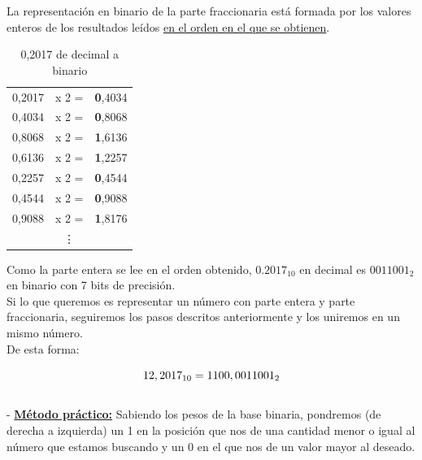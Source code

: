 \documentclass[12pt]{article}
\begin{document}
						La representación en binario de la parte fraccionaria está formada por los valores enteros de los resultados leídos \underline{en el orden en el que se obtienen}.
						
						\begin{table}[H]
							\centering
							\begin{tabular}{ccc}
								0,2017 & x 2 = & \textbf{0},4034 \\
								0,4034 & x 2 = & \textbf{0},8068 \\
								0,8068 & x 2 = & \textbf{1},6136 \\
								0,6136 & x 2 = & \textbf{1},2257 \\
								0,2257 & x 2 = & \textbf{0},4544 \\
								0,4544 & x 2 = & \textbf{0},9088 \\
								0,9088 & x 2 = & \textbf{1},8176 \\
								& \vdots & \\
							\end{tabular}
							\caption*{0,2017 de decimal a binario}						 
						\end{table}
						
						\newpage

						Como la parte entera se lee en el orden obtenido, $0.2017_{10}$ en decimal es $0011001_{2}$ en binario con 7 bits de precisión.\\
						
						Si lo que queremos es representar un número con parte entera y parte fraccionaria, seguiremos los pasos descritos anteriormente y los uniremos en un mismo número.\\
						
						De esta forma:
						
						\begin{equation}
							\notag
							12,2017_{10} = 1100,0011001_{2}
						\end{equation}\\
						
				- \underline{\textbf{Método práctico:}} Sabiendo los pesos de la base binaria, pondremos (de derecha a izquierda) un 1 en la posición que nos de una cantidad menor o igual al número que estamos buscando y un 0 en el que nos de un valor mayor al deseado.\\
						
\end{document}
